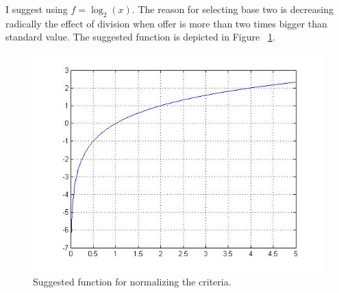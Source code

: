 I suggest using $f = \log _2 \left( x \right)$. The reason for selecting base two is decreasing radically the effect of division when offer is more than two times bigger than standard value. The suggested function is depicted in Figure ~\ref{fig:FUNC}.

\begin{figure}
  \centering
    \includegraphics[width=12cm]{diagram.jpg}
  \caption{Suggested function for normalizing the criteria.}
  \label{fig:FUNC}
\end{figure}
